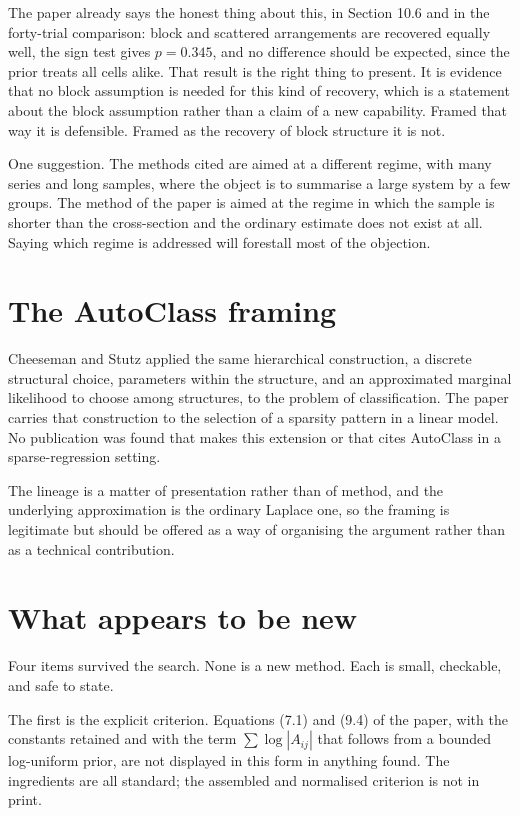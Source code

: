 The paper already says the honest thing about this, in Section 10.6 and in the
forty-trial comparison: block and scattered arrangements are recovered equally
well, the sign test gives $p = 0.345$, and no difference should be expected, since
the prior treats all cells alike. That result is the right thing to present. It is
evidence that no block assumption is needed for this kind of recovery, which is a
statement about the block assumption rather than a claim of a new capability.
Framed that way it is defensible. Framed as the recovery of block structure it is
not.

One suggestion. The methods cited are aimed at a different regime, with many series
and long samples, where the object is to summarise a large system by a few groups.
The method of the paper is aimed at the regime in which the sample is shorter than
the cross-section and the ordinary estimate does not exist at all. Saying which
regime is addressed will forestall most of the objection.

\section{The AutoClass framing}

Cheeseman and Stutz \cite{cheeseman1996} applied the same hierarchical
construction, a discrete structural choice, parameters within the structure, and an
approximated marginal likelihood to choose among structures, to the problem of
classification. The paper carries that construction to the selection of a sparsity
pattern in a linear model. No publication was found that makes this extension or
that cites AutoClass in a sparse-regression setting.

The lineage is a matter of presentation rather than of method, and the underlying
approximation is the ordinary Laplace one, so the framing is legitimate but should
be offered as a way of organising the argument rather than as a technical
contribution.

\section{What appears to be new}

Four items survived the search. None is a new method. Each is small, checkable, and
safe to state.

The first is the explicit criterion. Equations (7.1) and (9.4) of the paper, with
the constants retained and with the term $\sum \log |A_{ij}|$ that follows from a
bounded log-uniform prior, are not displayed in this form in anything found. The
ingredients are all standard; the assembled and normalised criterion is not in
print.

